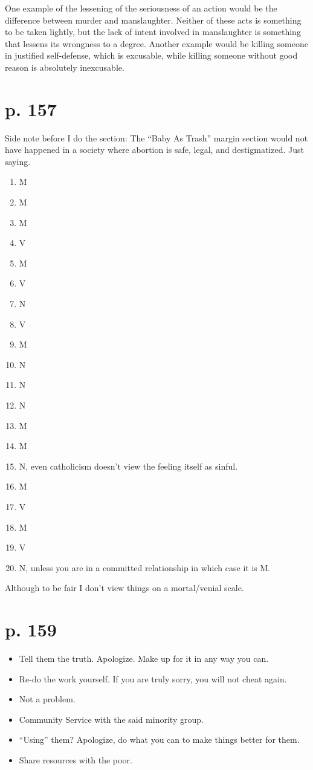 \documentclass[12pt]{article}
\begin{document}
	One example of the lessening of the seriousness of an action would be 
	the difference between murder and manslaughter.  Neither of these acts
	is something to be taken lightly, but the lack of intent involved in 
	manslaughter is something that lessens its wrongness to a degree.
	Another example would be killing someone in justified self-defense, which
	is excusable, while killing someone without good reason is absolutely
	inexcusable.

\section{p. 157}
	Side note before I do the section: The ``Baby As Trash'' margin section
	would not have happened in a society where abortion is safe, legal, and
	destigmatized.  Just saying.

\begin{enumerate}
	\item M
	\item M
	\item M
	\item V
	\item M
	\item V
	\item N
	\item V
	\item M
	\item N
	\item N
	\item N
	\item M
	\item M
	\item N, even catholicism doesn't view the feeling itself as sinful.
	\item M
	\item V
	\item M
	\item V
	\item N, unless you are in a committed relationship in which case it
		is M.
\end{enumerate}

Although to be fair I don't view things on a mortal/venial scale.

\section{p. 159}
\begin{itemize}
	\item Tell them the truth.  Apologize.  Make up for it in any way you
		can.
	\item Re-do the work yourself.  If you are truly sorry, you will not
		cheat again.
	\item Not a problem.
	\item Community Service with the said minority group.
	\item ``Using'' them?  Apologize, do what you can to make things better
		for them.
	\item Share resources with the poor.
\end{itemize}
\end{document}
